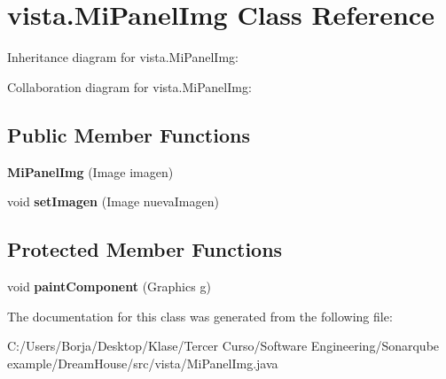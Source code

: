 \hypertarget{classvista_1_1_mi_panel_img}{}\section{vista.\+Mi\+Panel\+Img Class Reference}
\label{classvista_1_1_mi_panel_img}


Inheritance diagram for vista.\+Mi\+Panel\+Img\+:


Collaboration diagram for vista.\+Mi\+Panel\+Img\+:
\subsection*{Public Member Functions}
\begin{DoxyCompactItemize}
\item 
\mbox{\label{classvista_1_1_mi_panel_img_a7350fdda1a38fd8b1a4994cfedcde13c}} 
{\bfseries Mi\+Panel\+Img} (Image imagen)
\item 
\mbox{\label{classvista_1_1_mi_panel_img_a942afea9ab9fd9a6dbde01493f0e00a1}} 
void {\bfseries set\+Imagen} (Image nueva\+Imagen)
\end{DoxyCompactItemize}
\subsection*{Protected Member Functions}
\begin{DoxyCompactItemize}
\item 
\mbox{\label{classvista_1_1_mi_panel_img_af77d7ca2dae07436d36a06c31f00d6e1}} 
void {\bfseries paint\+Component} (Graphics g)
\end{DoxyCompactItemize}


The documentation for this class was generated from the following file\+:\begin{DoxyCompactItemize}
\item 
C\+:/\+Users/\+Borja/\+Desktop/\+Klase/\+Tercer Curso/\+Software Engineering/\+Sonarqube example/\+Dream\+House/src/vista/Mi\+Panel\+Img.\+java\end{DoxyCompactItemize}
